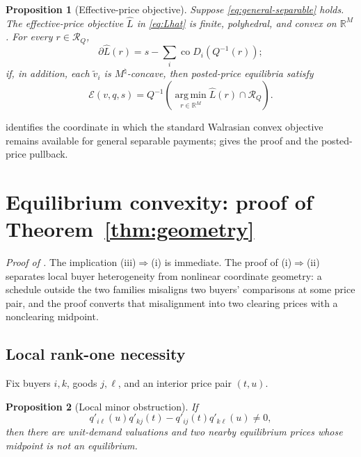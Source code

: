 \documentclass[11pt,a4paper,fleqn]{article}
\theoremstyle{plain}
\newtheorem{proposition}{Proposition}
\theoremstyle{definition}
\newcommand{\R}{\mathbb{R}}
\newcommand{\co}{\operatorname{co}}
\newcommand{\argmin}{\operatorname*{arg\,min}}
\newcommand{\Ecal}{\mathcal{E}}
\begin{document}
\begin{proposition}[Effective-price objective]\label{prop:effective}
Suppose \eqref{eq:general-separable} holds. The effective-price objective $\widehat L$ in \eqref{eq:Lhat} is finite, polyhedral, and convex on $\R^M$. For every $r\in\mathcal R_Q$,
\begin{equation}\label{eq:Lhat-subdiff}
\partial\widehat L(r)
=s-\sum_i\co D_i(Q^{-1}(r));
\end{equation}
if, in addition, each $\widetilde v_i$ is $M^\natural$-concave, then posted-price equilibria satisfy
\begin{equation}\label{eq:effective-minimizers}
\Ecal(v,q,s)=Q^{-1}\!\left(\argmin_{r\in\R^M}\widehat L(r)\cap\mathcal R_Q\right).
\end{equation}
\end{proposition}

 identifies the coordinate in which the standard Walrasian convex objective remains available for general separable payments;  gives the proof and the posted-price pullback.

\section{Equilibrium convexity: proof of Theorem~\ref{thm:geometry}}\label{sec:geometry}

\noindent\textit{Proof of .} The implication (iii)$\Rightarrow$(i) is immediate. The proof of (i)$\Rightarrow$(ii) separates local buyer heterogeneity from nonlinear coordinate geometry: a schedule outside the two families misaligns two buyers' comparisons at some price pair, and the proof converts that misalignment into two clearing prices with a nonclearing midpoint.

\subsection{Local rank-one necessity}

Fix buyers $i,k$, goods $j,\ell$, and an interior price pair $(t,u)$.

\begin{proposition}[Local minor obstruction]\label{prop:local-minor}
If
\[
q'_{i\ell}(u)q'_{kj}(t)-q'_{ij}(t)q'_{k\ell}(u)\ne0,
\]
then there are unit-demand valuations and two nearby equilibrium prices whose midpoint is not an equilibrium.
\end{proposition}
\end{document}
